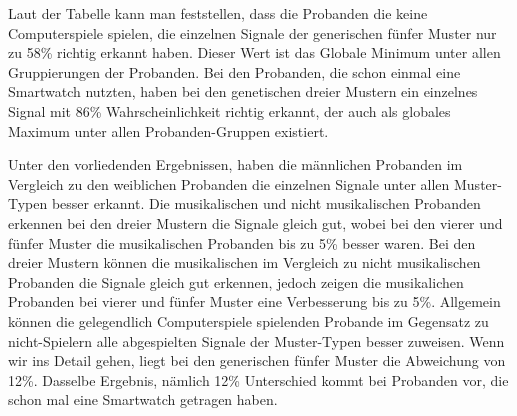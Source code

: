 Laut der Tabelle kann man feststellen, dass die Probanden die keine Computerspiele spielen, die einzelnen Signale der generischen fünfer Muster nur zu 58\% richtig erkannt haben. Dieser Wert ist das Globale Minimum unter allen Gruppierungen der Probanden.
Bei den Probanden, die schon einmal eine Smartwatch nutzten, haben bei den genetischen dreier Mustern ein einzelnes Signal mit 86\% Wahrscheinlichkeit richtig erkannt, der auch als globales Maximum unter allen Probanden-Gruppen existiert.


Unter den vorliedenden Ergebnissen, haben die männlichen Probanden im Vergleich zu den weiblichen Probanden die einzelnen Signale unter allen Muster-Typen besser erkannt.
Die musikalischen und nicht musikalischen Probanden erkennen bei den dreier Mustern die Signale gleich gut, wobei bei den vierer und fünfer Muster die musikalischen Probanden bis zu 5\% besser waren.
Bei den dreier Mustern können die musikalischen im Vergleich zu nicht musikalischen Probanden die Signale gleich gut erkennen, jedoch zeigen die musikalichen Probanden bei vierer und fünfer Muster eine Verbesserung bis zu 5\%.
Allgemein können die gelegendlich Computerspiele spielenden Probande im Gegensatz zu nicht-Spielern alle abgespielten Signale der Muster-Typen besser zuweisen. Wenn wir ins Detail gehen, liegt bei den generischen fünfer Muster die Abweichung von 12\%.
Dasselbe Ergebnis, nämlich 12\% Unterschied kommt bei Probanden vor, die schon mal eine Smartwatch getragen haben.

